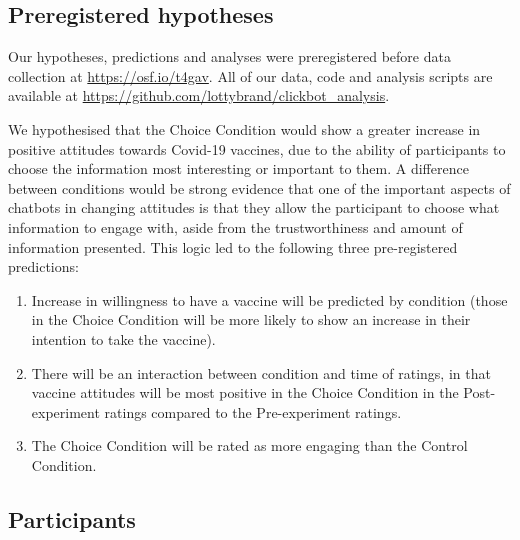 \documentclass[
  english,
  ,jou,floatsintext]{apa6}
\providecommand{\tightlist}{%
  \setlength{\itemsep}{0pt}\setlength{\parskip}{0pt}}
\begin{document}
\hypertarget{preregistered-hypotheses}{%
\subsection{Preregistered hypotheses}\label{preregistered-hypotheses}}

Our hypotheses, predictions and analyses were preregistered before data collection at \url{https://osf.io/t4gav}. All of our data, code and analysis scripts are available at \url{https://github.com/lottybrand/clickbot_analysis}.

We hypothesised that the Choice Condition would show a greater increase in positive attitudes towards Covid-19 vaccines, due to the ability of participants to choose the information most interesting or important to them. A difference between conditions would be strong evidence that one of the important aspects of chatbots in changing attitudes is that they allow the participant to choose what information to engage with, aside from the trustworthiness and amount of information presented. This logic led to the following three pre-registered predictions:

\begin{enumerate}
\def\labelenumi{\arabic{enumi})}
\tightlist
\item
  Increase in willingness to have a vaccine will be predicted by condition (those in the Choice Condition will be more likely to show an increase in their intention to take the vaccine).
\item
  There will be an interaction between condition and time of ratings, in that vaccine attitudes will be most positive in the Choice Condition in the Post-experiment ratings compared to the Pre-experiment ratings.
\item
  The Choice Condition will be rated as more engaging than the Control Condition.
\end{enumerate}

\hypertarget{participants}{%
\subsection{Participants}\label{participants}}
\end{document}
